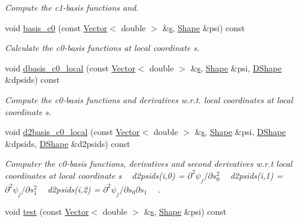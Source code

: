 \begin{DoxyCompactItemize}
\begin{DoxyCompactList}\small\item\em Compute the c1-\/basis functions and. \end{DoxyCompactList}\item 
void \hyperlink{classoomph_1_1BellElement_ad99554f0767e1d82e371ebce2219521b}{basis\+\_\+c0} (const \hyperlink{classoomph_1_1Vector}{Vector}$<$ double $>$ \&\hyperlink{cfortran_8h_ab7123126e4885ef647dd9c6e3807a21c}{s}, \hyperlink{classoomph_1_1Shape}{Shape} \&psi) const
\begin{DoxyCompactList}\small\item\em Calculate the c0-\/basis functions at local coordinate s. \end{DoxyCompactList}\item 
void \hyperlink{classoomph_1_1BellElement_a3a7b703738e3de182b26b299626d869a}{dbasis\+\_\+c0\+\_\+local} (const \hyperlink{classoomph_1_1Vector}{Vector}$<$ double $>$ \&\hyperlink{cfortran_8h_ab7123126e4885ef647dd9c6e3807a21c}{s}, \hyperlink{classoomph_1_1Shape}{Shape} \&psi, \hyperlink{classoomph_1_1DShape}{D\+Shape} \&dpsids) const
\begin{DoxyCompactList}\small\item\em Compute the c0-\/basis functions and derivatives w.\+r.\+t. local coordinates at local coordinate s. \end{DoxyCompactList}\item 
void \hyperlink{classoomph_1_1BellElement_a23f34f6479128e7e8c694fbcb72aae78}{d2basis\+\_\+c0\+\_\+local} (const \hyperlink{classoomph_1_1Vector}{Vector}$<$ double $>$ \&\hyperlink{cfortran_8h_ab7123126e4885ef647dd9c6e3807a21c}{s}, \hyperlink{classoomph_1_1Shape}{Shape} \&psi, \hyperlink{classoomph_1_1DShape}{D\+Shape} \&dpsids, \hyperlink{classoomph_1_1DShape}{D\+Shape} \&d2psids) const
\begin{DoxyCompactList}\small\item\em Computer the c0-\/basis functions, derivatives and second derivatives w.\+r.\+t local coordinates at local coordinate s ~\newline
d2psids(i,0) = $ \partial^2 \psi_j / \partial s_0^2 $ ~\newline
d2psids(i,1) = $ \partial^2 \psi_j / \partial s_1^2 $ ~\newline
d2psids(i,2) = $ \partial^2 \psi_j / \partial s_0 \partial s_1 $ ~\newline
. \end{DoxyCompactList}\item 
void \hyperlink{classoomph_1_1BellElement_a99afdb504fee71cb9c557ecb5069cd95}{test} (const \hyperlink{classoomph_1_1Vector}{Vector}$<$ double $>$ \&\hyperlink{cfortran_8h_ab7123126e4885ef647dd9c6e3807a21c}{s}, \hyperlink{classoomph_1_1Shape}{Shape} \&psi) const

\end{DoxyCompactItemize}
